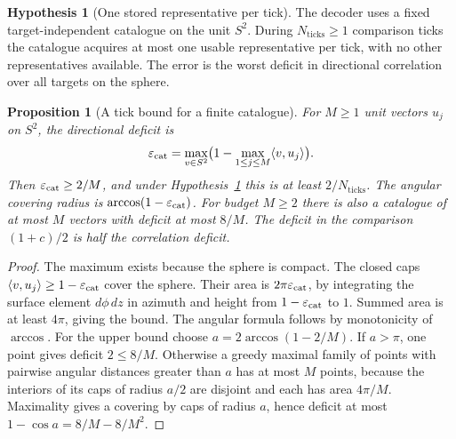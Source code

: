 \documentclass[11pt,reqno]{amsart}
\newtheorem{proposition}[theorem]{Proposition}
\theoremstyle{definition}
\newtheorem{hypothesis}[theorem]{Hypothesis}
\theoremstyle{remark}
\numberwithin{equation}{section}
\begin{document}
\begin{hypothesis}[One stored representative per tick]\label{d4:tickhyp}
The decoder uses a fixed target-independent catalogue on the unit
\(S^2\). During \(N_{\mathrm{ticks}}\ge1\) comparison ticks the
catalogue acquires at most one usable representative per tick, with
no other representatives available. The error is the worst deficit in
directional correlation over all targets on the sphere.
\end{hypothesis}

\begin{proposition}[A tick bound for a finite catalogue]\label{d4:caps}
For \(M\ge1\) unit vectors \(u_j\) on \(S^2\), the directional deficit is
\[
 \varepsilon_{\rm cat}
   =\max_{v\in S^2}\bigl(1-\max_{1\le j\le M}\langle v,u_j\rangle\bigr).
\]
Then \(\varepsilon_{\rm cat}\ge2/M\), and under
Hypothesis~\ref{d4:tickhyp} this is at least \(2/N_{\mathrm{ticks}}\).
The angular covering radius is
\(\arccos(1-\varepsilon_{\rm cat})\). For budget \(M\ge2\) there is also a
catalogue of at most \(M\) vectors with deficit at most \(8/M\).
The deficit in the comparison \((1+c)/2\) is half the correlation deficit.
\end{proposition}

\begin{proof}
The maximum exists because the sphere is compact. The closed caps
\(\langle v,u_j\rangle\ge1-\varepsilon_{\rm cat}\) cover the sphere.
Their area is \(2\pi\varepsilon_{\rm cat}\), by integrating the surface
element \(d\phi\,dz\) in azimuth and height from \(1-\varepsilon_{\rm cat}\)
to \(1\). Summed area is at least \(4\pi\), giving the bound. The angular
formula follows by monotonicity of \(\arccos\). For the upper bound choose
\(a=2\arccos(1-2/M)\). If \(a>\pi\), one point gives deficit
\(2\le8/M\). Otherwise a greedy maximal family of points with pairwise
angular distances greater than \(a\) has at most \(M\) points, because
the interiors of its caps of radius \(a/2\) are disjoint and each has
area \(4\pi/M\). Maximality gives a covering by caps of radius \(a\),
hence deficit at most \(1-\cos a=8/M-8/M^2\).
\end{proof}
\end{document}

